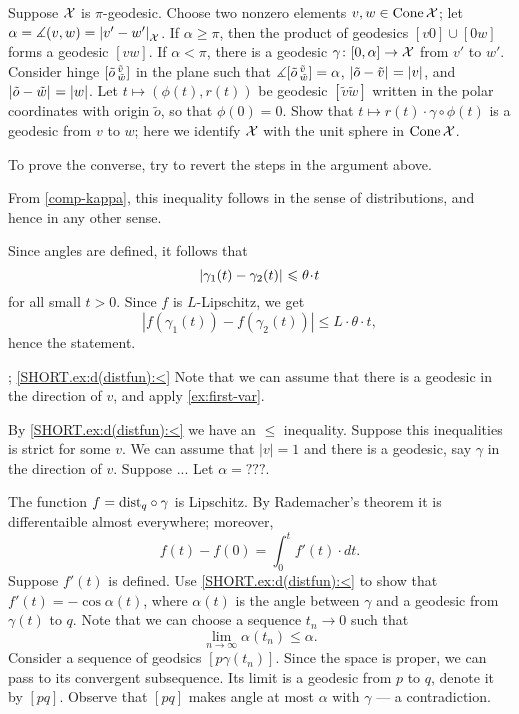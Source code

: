 Suppose $\mathcal{X}$ is $\pi$-geodesic.
Choose two nonzero elements $v,w\in\mathop{\rm Cone}\nolimits \mathcal{X}$; let $\alpha=\mangle(v,w)=\dist{v'}{w'}{\spc{X}}$.
If $\alpha\ge \pi$, then the product of geodesics $[v0]\cup [0w]$ forms a geodesic $[vw]$.
If $\alpha<\pi$, there is a geodesic $\gamma\colon[0,\alpha]\to \mathcal{X}$ from $v'$ to $w'$.
Consider hinge $[\tilde o\,{}^{\tilde v}_{\tilde w}]$ in the plane 
such that $\measuredangle[\tilde o\,{}^{\tilde v}_{\tilde w}]=\alpha$, $\dist{\tilde o}{\tilde v}{}=|v|$, and $\dist{\tilde o}{\tilde w}{}=|w|$.
Let $t\mapsto (\phi(t),r(t))$ be geodesic $[\tilde v\tilde w]$ written in the polar coordinates with origin $\tilde o$, so that $\phi(0)=0$.
Show that $t\mapsto r(t)\cdot\gamma\circ\phi(t)$ is a geodesic from $v$ to $w$;
here we identify $\mathcal{X}$ with the unit sphere in $\mathop{\rm Cone}\nolimits \mathcal{X}$.

To prove the converse, try to revert the steps in the argument above.


 From \ref{comp-kappa}, this inequality follows in the sense of distributions, and hence in any other sense.

Since angles are defined, it follows that 
\[\dist{\gamma_1(t)}{\gamma_2(t)}{}\le \theta\cdot t\]
for all small $t>0$.
Since $f$ is $L$-Lipschitz, we get 
\[|f(\gamma_1(t))-f(\gamma_2(t))|\le L\cdot \theta\cdot t,\]
hence the statement.

\parbf{\ref{ex:d(distfun)}}; \ref{SHORT.ex:d(distfun):<}
Note that we can assume that there is a geodesic in the direction of $v$, and apply \ref{ex:first-var}.

By \ref{SHORT.ex:d(distfun):<} we have an $\le$ inequality.
Suppose this inequalities is strict for some $v$.
We can assume that $|v|=1$ and there is a geodesic, say $\gamma$ in the direction of $v$.
Suppose ...
Let $\alpha=???$.

The function $f=\mathrm{dist}_q\circ\gamma$ is Lipschitz.
By Rademacher's theorem it is differentaible almost everywhere;
moreover, 
\[f(t)-f(0)=\int_0^t f'(t)\cdot dt.\]
Suppose $f'(t)$ is defined.
Use \ref{SHORT.ex:d(distfun):<} to show that 
$f'(t)=-\cos\alpha(t)$, where $\alpha(t)$ is the angle between $\gamma$ and a geodesic from $\gamma(t)$ to $q$.
Note that we can choose a sequence $t_n\to 0$ such that 
\[\lim_{n\to\infty}\alpha(t_n) \le \alpha.\]
Consider a sequence of geodsics $[p\gamma(t_n)]$.
Since the space is proper, we can pass to its convergent subsequence.
Its limit is a geodesic from $p$ to $q$, denote it by $[pq]$.
Observe that $[pq]$ makes angle at most $\alpha$ with $\gamma$ --- a contradiction.
 
